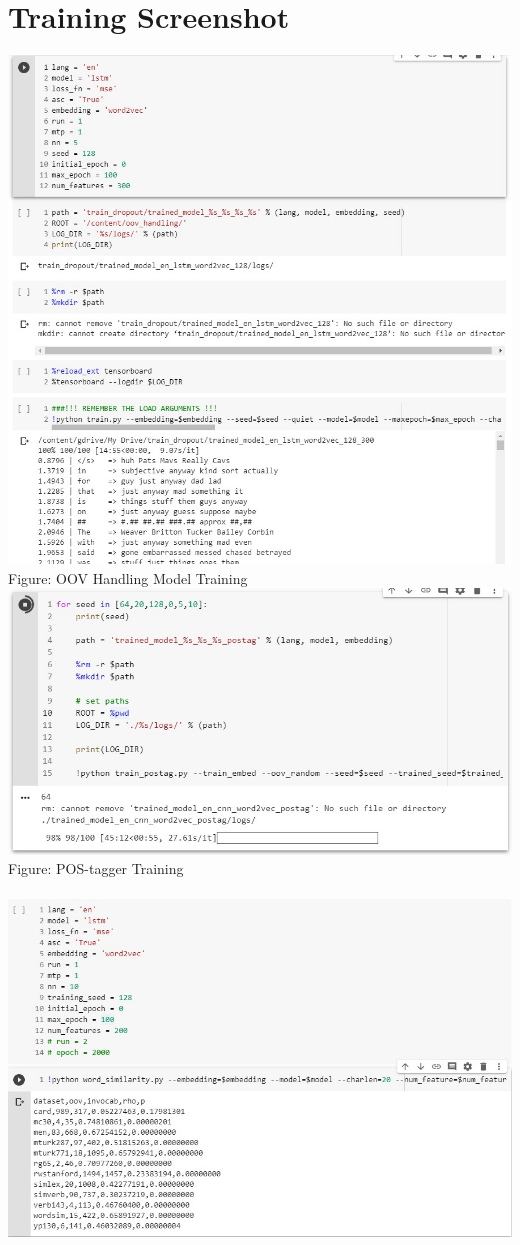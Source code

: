 \documentclass[a4paper,12pt]{report}
\begin{document}
\section*{Training Screenshot}
\centering
\includegraphics[width=.8\linewidth]{images/train_oovmodel_white.jpg}\\
Figure: OOV Handling Model Training
\centering
\includegraphics[width=.8\linewidth]{images/train_postag_white.jpg}\\
Figure: POS-tagger Training\\~\\
\includegraphics[width=.8\linewidth]{images/calculate_wordsim_white.jpg}\\
\end{document}
